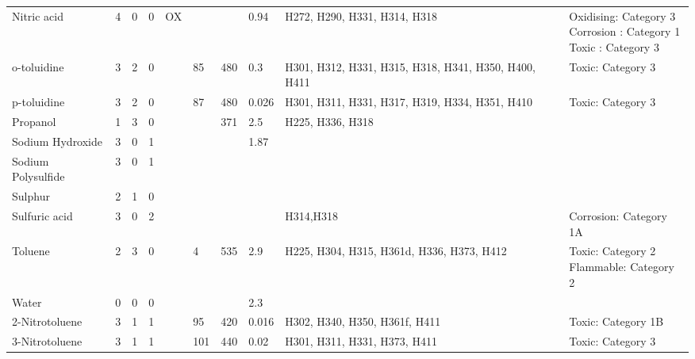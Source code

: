 \begin{landscape}
\begin{longtable}{lcccclllp{3cm}l}
Nitric acid         & 4   &  0    & 0   & OX            &                       &                       & 0.94             & H272, H290, H331, H314, H318 & \splitcell{Oxidising: Category 3\\ Corrosion : Category 1\\ Toxic : Category 3} \\
o-toluidine         & 3   &  2    & 0   &               & 85                    & 480                   & 0.3              & H301, H312,  H331, H315, H318, H341, H350, H400, H411 & Toxic: Category 3 \\
p-toluidine         & 3   &  2    & 0   &               & 87                    & 480                   & 0.026            & H301, H311, H331, H317, H319, H334, H351, H410 & Toxic: Category 3 \\
Propanol            & 1   &  3    & 0   &               &                       & 371                   & 2.5              & H225, H336, H318 & \\
Sodium Hydroxide    & 3   &  0    & 1   &               &                       &                       & 1.87             &   & \\
Sodium Polysulfide  & 3   &  0    & 1   &               &                       &                       &                  &   & \\
Sulphur             & 2   &  1    & 0   &               &                       &                       &                  &   & \\
Sulfuric acid       & 3   &  0    & 2   &               &                       &                       &                  & H314,H318  & Corrosion: Category 1A \\
Toluene             & 2   &  3    & 0   &               & 4                     & 535                   & 2.9              & H225, H304, H315, H361d, H336, H373, H412    & \splitcell{Toxic: Category 2\\ Flammable: Category 2}  \\
Water               & 0   &  0    & 0   &               &                       &                       & 2.3              &   & \\
2-Nitrotoluene      & 3   &  1    & 1   &               & 95                    & 420                   & 0.016            & H302, H340, H350, H361f, H411 & Toxic: Category 1B \\ 
3-Nitrotoluene      & 3   &  1    & 1   &               & 101                   & 440                   & 0.02             & H301, H311, H331, H373, H411  & Toxic: Category 3 \\ 

\end{longtable}
\end{landscape}
